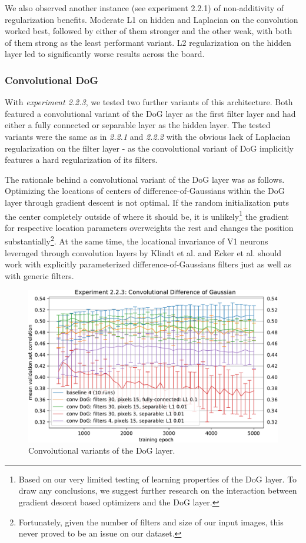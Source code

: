 We also observed another instance (see experiment 2.2.1) of non-additivity of regularization benefits. Moderate L1 on hidden and Laplacian on the convolution worked best, followed by either of them stronger and the other weak, with both of them strong as the least performant variant. L2 regularization on the hidden layer led to significantly worse results across the board.

\subsubsection{Convolutional DoG}

With \textit{experiment 2.2.3}, we tested two further variants of this architecture. Both featured a convolutional variant of the DoG layer as the first filter layer and had either a fully connected or separable layer as the hidden layer. The tested variants were the same as in \textit{2.2.1} and \textit{2.2.2} with the obvious lack of Laplacian regularization on the filter layer - as the convolutional variant of DoG implicitly features a hard regularization of its filters.

The rationale behind a convolutional variant of the DoG layer was as follows. Optimizing the locations of centers of difference-of-Gaussians within the DoG layer through gradient descent is not optimal. If the random initialization puts the center completely outside of where it should be, it is unlikely\footnote{Based on our very limited testing of learning properties of the DoG layer. To draw any conclusions, we suggest further research on the interaction between gradient descent based optimizers and the DoG layer.} the gradient for respective location parameters overweights the rest and changes the position substantially\footnote{Fortunately, given the number of filters and size of our input images, this never proved to be an issue on our dataset.}. At the same time, the locational invariance of V1 neurons leveraged through convolution layers by Klindt et al. and Ecker et al. should work with explicitly parameterized difference-of-Gaussians filters just as well as with generic filters.

\begin{figure}[H]
    \centering
    \includegraphics[width=1\textwidth]{../figures/05_2_2_3}
    \caption[Experiment 2.2.3]{Convolutional variants of the DoG layer.}
    \label{fig:5.2.2.3}
\end{figure}


